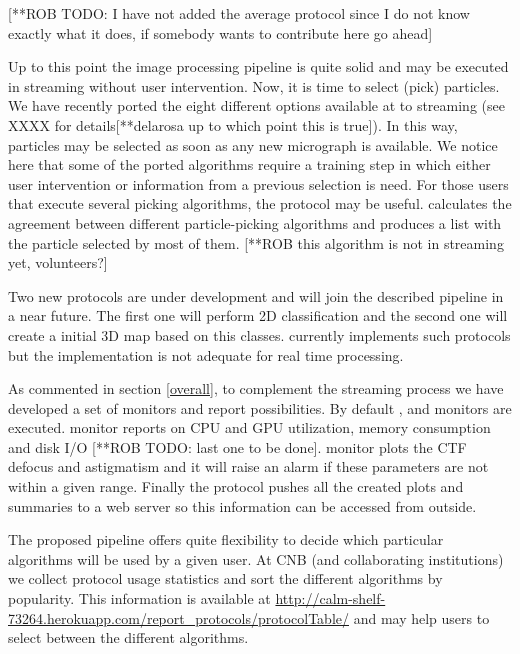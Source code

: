 [**ROB TODO: I have not added the average protocol since I do not know exactly what it does, if somebody wants to contribute here go ahead]

Up to this point the image processing pipeline is quite solid and may be executed in streaming without user intervention. Now, it is time to select (pick) particles. We have recently ported the eight different options available at \scipion  to streaming (see XXXX for details[**delarosa up to which point this is true]). In this way,  particles may be selected as soon as any new micrograph is available. We notice here that some of the ported algorithms require a training step in which either user intervention or information from a previous selection is need. For those users that execute several picking algorithms, the protocol  may be useful.   calculates the agreement between different particle-picking algorithms and produces a list with the particle selected by most of them. [**ROB this algorithm is not in streaming yet, volunteers?]

Two new protocols are under development and will join the described  pipeline in a near future. The first one will perform 2D classification and the second one will create a initial 3D map based on this classes. \scipion currently implements such protocols but the implementation is not adequate for real time processing.

As commented in section \ref{overall}, to complement the streaming process we have developed a set of monitors and report possibilities. By default ,  and  monitors are executed.  monitor reports on  CPU and GPU utilization, memory consumption and disk I/O [**ROB TODO: last one to be done].  monitor plots the CTF defocus and astigmatism  and it will raise an alarm if these parameters are not within a given range. Finally the  protocol pushes all the created plots and summaries to a web server 
so this information can be accessed from outside.

The proposed pipeline offers quite flexibility to decide which particular algorithms will be used by a given user. At CNB (and collaborating institutions) we collect protocol usage statistics and sort the different algorithms by popularity.  This information is available at  \url{http://calm-shelf-73264.herokuapp.com/report_protocols/protocolTable/} and may help users to select   between the different algorithms.

